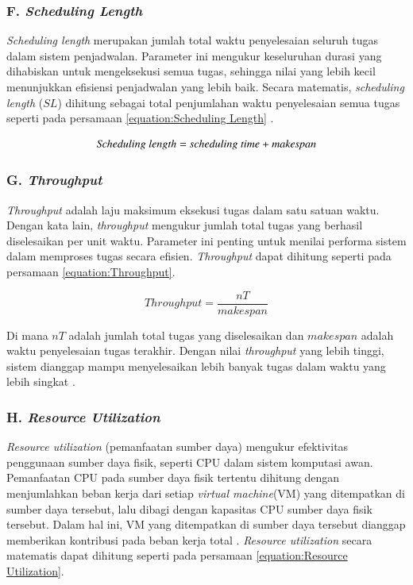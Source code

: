 \subsubsection{F. \textit{Scheduling Length}}
\textit{Scheduling length} merupakan jumlah total waktu penyelesaian seluruh tugas dalam sistem penjadwalan. Parameter ini mengukur keseluruhan durasi yang dihabiskan untuk mengeksekusi semua tugas, sehingga nilai yang lebih kecil menunjukkan efisiensi penjadwalan yang lebih baik. Secara matematis, \textit{scheduling length} ($SL$) dihitung sebagai total penjumlahan waktu penyelesaian semua tugas seperti pada persamaan \ref{equation:Scheduling Length} \parencite{Emara2021}.

\begin{equation}
\label{equation:Scheduling Length}
    \text{\textit{Scheduling length}} = \text {\textit{scheduling time}} + \textit{makespan}
\end{equation}

\subsubsection{G. \textit{Throughput}}
\textit{Throughput} adalah laju maksimum eksekusi tugas dalam satu satuan waktu. Dengan kata lain, \textit{throughput} mengukur jumlah total tugas yang berhasil diselesaikan per unit waktu. Parameter ini penting untuk menilai performa sistem dalam memproses tugas secara efisien. \textit{Throughput} dapat dihitung seperti pada persamaan \ref{equation:Throughput}.

\begin{equation}
\label{equation:Throughput}
    Throughput = \frac{nT}{makespan}
\end{equation}

Di mana $nT$ adalah jumlah total tugas yang diselesaikan dan $makespan$ adalah waktu penyelesaian tugas terakhir. Dengan nilai \textit{throughput} yang lebih tinggi, sistem dianggap mampu menyelesaikan lebih banyak tugas dalam waktu yang lebih singkat \parencite{Emara2021}.

\subsubsection{H. \textit{Resource Utilization}}
\textit{Resource utilization} (pemanfaatan sumber daya) mengukur efektivitas penggunaan sumber daya fisik, seperti CPU dalam sistem komputasi awan. Pemanfaatan CPU pada sumber daya fisik tertentu dihitung dengan menjumlahkan beban kerja dari setiap \textit{virtual machine}(VM) yang ditempatkan di sumber daya tersebut, lalu dibagi dengan kapasitas CPU sumber daya fisik tersebut. Dalam hal ini, VM yang ditempatkan di sumber daya tersebut dianggap memberikan kontribusi pada beban kerja total \parencite{Emara2021}. \textit{Resource utilization} secara matematis dapat dihitung seperti pada persamaan \ref{equation:Resource Utilization}.

